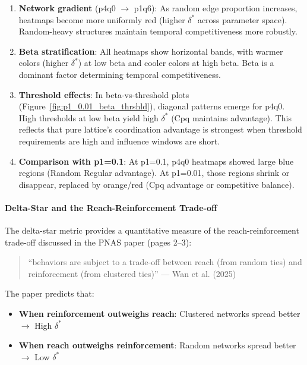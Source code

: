 \documentclass[12pt,a4paper]{article}
\begin{document}
\begin{enumerate}
    \item \textbf{Network gradient} (p4q0 $\to$ p1q6): As random edge proportion increases, heatmaps become more uniformly red (higher $\delta^*$ across parameter space). Random-heavy structures maintain temporal competitiveness more robustly.

    \item \textbf{Beta stratification}: All heatmaps show horizontal bands, with warmer colors (higher $\delta^*$) at low beta and cooler colors at high beta. Beta is a dominant factor determining temporal competitiveness.

    \item \textbf{Threshold effects}: In beta-vs-threshold plots (Figure~\ref{fig:p1_0.01_beta_thrshld}), diagonal patterns emerge for p4q0. High thresholds at low beta yield high $\delta^*$ (Cpq maintains advantage). This reflects that pure lattice's coordination advantage is strongest when threshold requirements are high and influence windows are short.

    \item \textbf{Comparison with p1=0.1}: At p1=0.1, p4q0 heatmaps showed large blue regions (Random Regular advantage). At p1=0.01, those regions shrink or disappear, replaced by orange/red (Cpq advantage or competitive balance).
\end{enumerate}

\paragraph{Delta-Star and the Reach-Reinforcement Trade-off}

The delta-star metric provides a quantitative measure of the reach-reinforcement trade-off discussed in the PNAS paper (pages 2--3):

\begin{quote}
``behaviors are subject to a trade-off between reach (from random ties) and reinforcement (from clustered ties)'' --- Wan et al. (2025)
\end{quote}

The paper predicts that:
\begin{itemize}
    \item \textbf{When reinforcement outweighs reach}: Clustered networks spread better $\to$ High $\delta^*$
    \item \textbf{When reach outweighs reinforcement}: Random networks spread better $\to$ Low $\delta^*$
\end{itemize}
\end{document}
